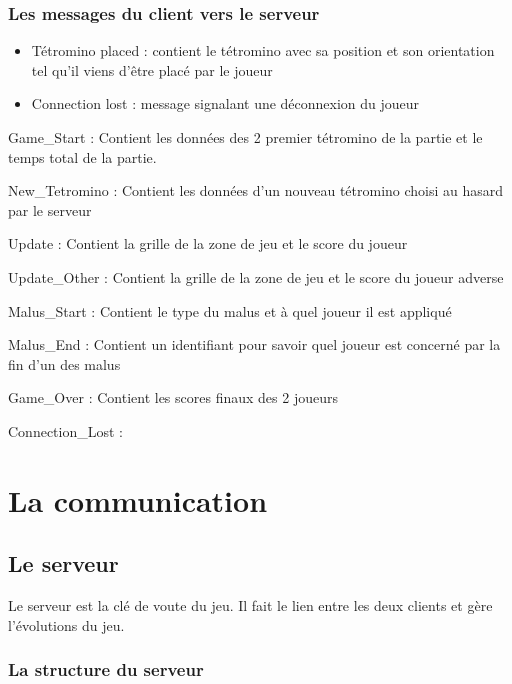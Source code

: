 \documentclass[a4paper, 12pt]{article}
\begin{document}
			\subsubsection{Les messages du client vers le serveur}

				\begin{itemize}
					\item Tétromino placed : contient le tétromino avec sa position et son orientation tel qu'il viens d'être placé par le joueur
					\item Connection lost : message signalant une déconnexion du joueur
				\end{itemize}


Game\_Start : 
    Contient les données des 2 premier tétromino de la partie et le temps total de la partie.

New\_Tetromino :
    Contient les données d’un nouveau tétromino choisi au hasard par le serveur

Update : 
    Contient la grille de la zone de jeu et le score du joueur

Update\_Other :
    Contient la grille de la zone de jeu et le score du joueur adverse

Malus\_Start : 
    Contient le type du malus et à quel joueur il est appliqué

Malus\_End :
    Contient un identifiant pour savoir quel joueur est concerné par la fin d’un des malus

Game\_Over :
    Contient les scores finaux des 2 joueurs

Connection\_Lost : 
    



\section{La communication}
	\subsection{Le serveur}

		Le serveur est la clé de voute du jeu. Il fait le lien entre les deux clients et gère l'évolutions du jeu.

		\subsubsection{La structure du serveur}
\end{document}
